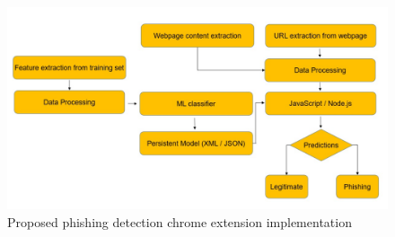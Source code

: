 \documentclass[conference]{IEEEtran}
\begin{document}
\begin{figure}
    \centering
    \includegraphics[width=\linewidth]{Fig1.jpg}
    \caption{Proposed phishing detection chrome extension
implementation}
    \label{fig:1}
\end{figure}
\end{document}
